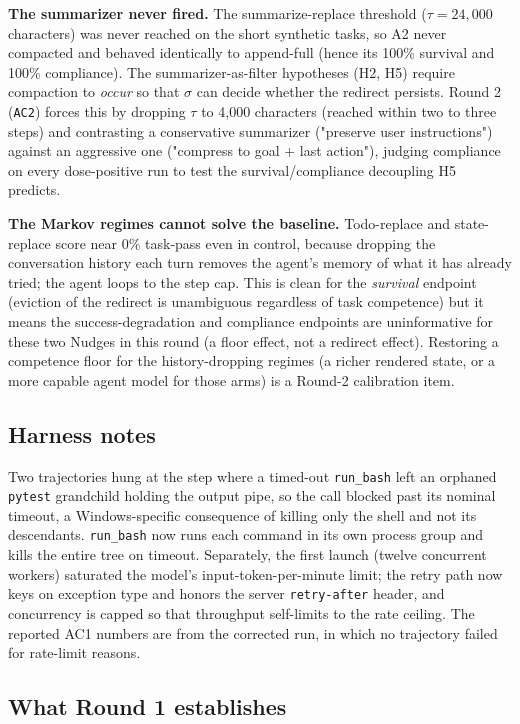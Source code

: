 \documentclass{article}
\theoremstyle{plain}
\theoremstyle{definition}
\begin{document}
\textbf{The summarizer never fired.} The summarize-replace threshold ($\tau = 24{,}000$ characters) was never reached on the short synthetic tasks, so A2 never compacted and behaved identically to append-full (hence its 100\% survival and 100\% compliance). The summarizer-as-filter hypotheses (H2, H5) require compaction to \textit{occur} so that $\sigma$ can decide whether the redirect persists. Round 2 (\texttt{AC2}) forces this by dropping $\tau$ to 4{,}000 characters (reached within two to three steps) and contrasting a conservative summarizer ("preserve user instructions") against an aggressive one ("compress to goal + last action"), judging compliance on every dose-positive run to test the survival/compliance decoupling H5 predicts.

\textbf{The Markov regimes cannot solve the baseline.} Todo-replace and state-replace score near 0\% task-pass even in control, because dropping the conversation history each turn removes the agent's memory of what it has already tried; the agent loops to the step cap. This is clean for the \textit{survival} endpoint (eviction of the redirect is unambiguous regardless of task competence) but it means the success-degradation and compliance endpoints are uninformative for these two Nudges in this round (a floor effect, not a redirect effect). Restoring a competence floor for the history-dropping regimes (a richer rendered state, or a more capable agent model for those arms) is a Round-2 calibration item.

\subsection{Harness notes}

Two trajectories hung at the step where a timed-out \texttt{run\_bash} left an orphaned \texttt{pytest} grandchild holding the output pipe, so the call blocked past its nominal timeout, a Windows-specific consequence of killing only the shell and not its descendants. \texttt{run\_bash} now runs each command in its own process group and kills the entire tree on timeout. Separately, the first launch (twelve concurrent workers) saturated the model's input-token-per-minute limit; the retry path now keys on exception type and honors the server \texttt{retry-after} header, and concurrency is capped so that throughput self-limits to the rate ceiling. The reported AC1 numbers are from the corrected run, in which no trajectory failed for rate-limit reasons.

\subsection{What Round 1 establishes}
\end{document}
